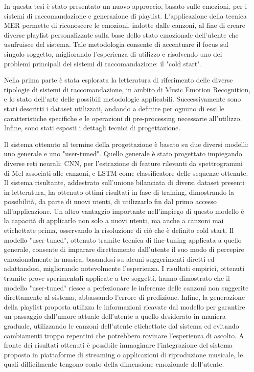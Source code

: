 \documentclass[11pt]{report}
\begin{document}
In questa tesi è stato presentato un nuovo approccio, basato sulle emozioni, per i sistemi di raccomandazione e generazione di playlist. L'applicazione della tecnica MER permette di riconoscere le emozioni, indotte dalle canzoni, al fine di creare diverse playlist personalizzate sulla base dello stato emozionale dell'utente che usufruisce del sistema. Tale metodologia consente di accentuare il focus sul singolo soggetto, migliorando l'esperienza di utilizzo e risolvendo uno dei problemi principali dei sistemi di raccomandazione: il "cold start". 

Nella prima parte è stata esplorata la letteratura di riferimento delle diverse tipologie di sistemi di raccomandazione, in ambito di Music Emotion Recognition, e lo stato dell'arte delle possibili metodologie applicabili. Successivamente sono stati descritti i dataset utilizzati, andando a definire per ognuno di essi le caratteristiche specifiche e le operazioni di pre-processing necessarie all'utilizzo. Infine, sono stati esposti i dettagli tecnici di progettazione. 


Il sistema ottenuto al termine della progettazione è basato su due diversi modelli: uno generale e uno "user-tuned". Quello generale è stato progettato impiegando diverse reti neurali: CNN, per l'estrazione di feature rilevanti da spettrogrammi di Mel associati alle canzoni, e LSTM come classificatore delle sequenze ottenute. Il sistema risultante, addestrato sull'unione bilanciata di diversi dataset presenti in letteratura, ha ottenuto ottimi risultati in fase di training, dimostrando la possibilità, da parte di nuovi utenti, di utilizzarlo fin dal primo accesso all'applicazione. Un altro vantaggio importante nell'impiego di questo modello è la capacità di applicarlo non solo a nuovi utenti, ma anche a canzoni mai etichettate prima, osservando la risoluzione di ciò che è definito cold start. Il modello "user-tuned", ottenuto tramite tecnica di fine-tuning applicata a quello generale, consente di imparare direttamente dall'utente il suo modo di percepire emozionalmente la musica, basandosi su alcuni suggerimenti diretti ed adattandosi, migliorando notevolmente l'esperienza. I risultati empirici, ottenuti tramite prove sperimentali applicate a tre soggetti, hanno dimostrato che il modello "user-tuned" riesce a perfezionare le inferenze delle canzoni non suggerite direttamente al sistema, abbassando l'errore di predizione. Infine, la generazione della playlist proposta utilizza le informazioni ricavate dal modello per garantire un passaggio dall'umore attuale dell'utente a quello desiderato in maniera graduale, utilizzando le canzoni dell'utente etichettate dal sistema ed evitando cambiamenti troppo repentini che potrebbero rovinare l'esperienza di ascolto. A fronte dei risultati ottenuti è possibile immaginare l'integrazione del sistema proposto in piattaforme di streaming o applicazioni di riproduzione musicale, le quali difficilmente tengono conto della dimensione emozionale dell'utente.
\end{document}
